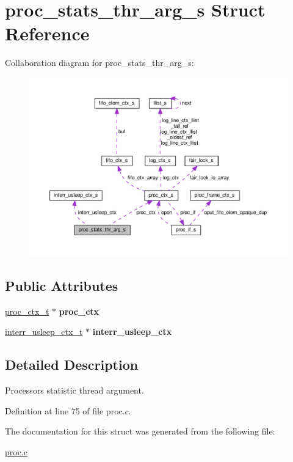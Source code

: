 \hypertarget{structproc__stats__thr__arg__s}{}\section{proc\+\_\+stats\+\_\+thr\+\_\+arg\+\_\+s Struct Reference}
\label{structproc__stats__thr__arg__s}


Collaboration diagram for proc\+\_\+stats\+\_\+thr\+\_\+arg\+\_\+s\+:\nopagebreak
\begin{figure}[H]
\begin{center}
\leavevmode
\includegraphics[width=350pt]{structproc__stats__thr__arg__s__coll__graph}
\end{center}
\end{figure}
\subsection*{Public Attributes}
\begin{DoxyCompactItemize}
\item 
\hyperlink{proc_8h_ae264f89be30fc03f5053bc16d58cba05}{proc\+\_\+ctx\+\_\+t} $\ast$ {\bfseries proc\+\_\+ctx}\hypertarget{structproc__stats__thr__arg__s_aea5e0454e53d7949073097b9b3fd078f}{}\label{structproc__stats__thr__arg__s_aea5e0454e53d7949073097b9b3fd078f}

\item 
\hyperlink{interr__usleep_8c_a952a138df6a0c053aa91d931c6c7de57}{interr\+\_\+usleep\+\_\+ctx\+\_\+t} $\ast$ {\bfseries interr\+\_\+usleep\+\_\+ctx}\hypertarget{structproc__stats__thr__arg__s_a645c614b9a184f3ae3eea58b9ebf9bc6}{}\label{structproc__stats__thr__arg__s_a645c614b9a184f3ae3eea58b9ebf9bc6}

\end{DoxyCompactItemize}


\subsection{Detailed Description}
Processor\textquotesingle{}s statistic thread argument. 

Definition at line 75 of file proc.\+c.



The documentation for this struct was generated from the following file\+:\begin{DoxyCompactItemize}
\item 
\hyperlink{proc_8c}{proc.\+c}\end{DoxyCompactItemize}
